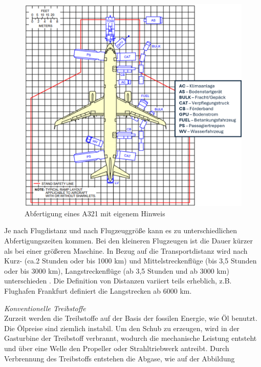 \begin{figure}[h]
	\centering
	\includegraphics[width=0.8\linewidth]{Bilder/A321_Abfertigung.png}
	\caption[Abfertigung]{Abfertigung eines A321 \cite{airbus2022a321} mit eigenem Hinweis}
	\label{abfertigung}
\end{figure}

Je nach Flugdistanz und nach Flugzeuggröße kann es zu unterschiedlichen Abfertigungszeiten kommen. Bei den kleineren Flugzeugen ist die Dauer 
kürzer als bei einer größeren Maschine. 
In Bezug auf die Transportdistanz wird nach Kurz- (ca.2 Stunden oder bis 1000 km) 
und Mittelstreckenflüge (bis 3,5 Stunden oder bis 3000 km), Langstreckenflüge (ab 3,5 Stunden und ab 3000 km) unterschieden \cite{mensen2013handbuch}.
Die Definition von Distanzen variiert teils erheblich, z.B. Flughafen Frankfurt definiert die Langstrecken ab 6000 km.%

\textit{Konventionelle Treibstoffe}\\
Zurzeit werden die Treibstoffe auf der Basis der fossilen Energie, wie Öl benutzt. Die Ölpreise sind ziemlich instabil. %
Um den Schub zu erzeugen, wird in der Gasturbine der Treibstoff verbrannt, wodurch die mechanische Leistung entsteht 
und über eine Welle den Propeller oder Strahltriebwerk antreibt. Durch Verbrennung des Treibstoffs entstehen die Abgase, wie auf der Abbildung
